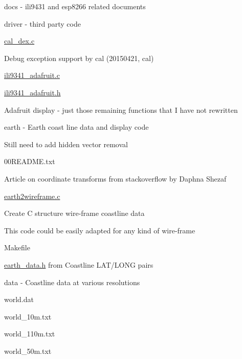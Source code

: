 docs -\/ ili9431 and esp8266 related documents


\begin{DoxyItemize}
\item driver -\/ third party code
\begin{DoxyItemize}
\item \hyperlink{cal__dex_8c}{cal\+\_\+dex.\+c}
\begin{DoxyItemize}
\item Debug exception support by cal (20150421, cal)
\end{DoxyItemize}
\item \hyperlink{ili9341__adafruit_8c}{ili9341\+\_\+adafruit.\+c}
\item \hyperlink{ili9341__adafruit_8h}{ili9341\+\_\+adafruit.\+h}
\begin{DoxyItemize}
\item Adafruit display -\/ just those remaining functions that I have not rewritten
\end{DoxyItemize}
\end{DoxyItemize}
\end{DoxyItemize}

earth -\/ Earth coast line data and display code
\begin{DoxyItemize}
\item Still need to add hidden vector removal
\begin{DoxyItemize}
\item 00\+R\+E\+A\+D\+M\+E.\+txt
\begin{DoxyItemize}
\item Article on coordinate transforms from stackoverflow by Daphna Shezaf
\end{DoxyItemize}
\item \hyperlink{earth2wireframe_8c}{earth2wireframe.\+c}
\begin{DoxyItemize}
\item Create C structure wire-\/frame coastline data
\item This code could be easily adapted for any kind of wire-\/frame
\end{DoxyItemize}
\item Makefile
\begin{DoxyItemize}
\item \hyperlink{earth__data_8h}{earth\+\_\+data.\+h} from Coastline L\+A\+T/\+L\+O\+NG pairs
\end{DoxyItemize}
\item data -\/ Coastline data at various resolutions
\begin{DoxyItemize}
\item world.\+dat
\item world\+\_\+10m.\+txt
\item world\+\_\+110m.\+txt
\item world\+\_\+50m.\+txt
\end{DoxyItemize}
\end{DoxyItemize}
\end{DoxyItemize}

